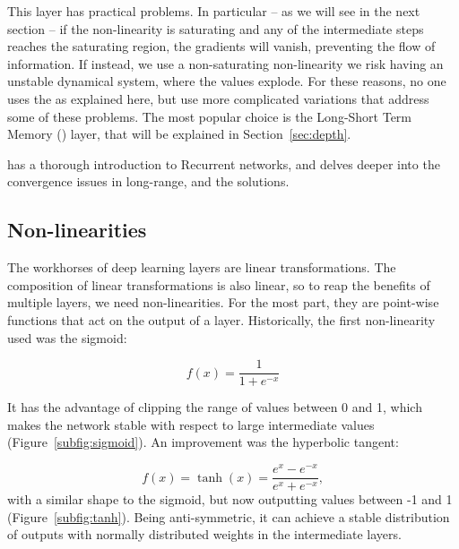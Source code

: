 This layer has practical problems.
In particular -- as we will see in the next section --  
if the non-linearity is saturating and any of the intermediate steps reaches the saturating region, the gradients will vanish, preventing the flow of information.
If instead, we use a non-saturating non-linearity we risk having an unstable dynamical system, where the values explode.
For these reasons, no one uses the \RNN{} as explained here, but use more complicated variations that address some of these problems.
The most popular choice \sidenote{\LSTM} is the Long-Short Term Memory (\LSTM) layer, that will be explained in Section~\ref{sec:depth}.


\citet{unreasonable_RNN} has a thorough introduction to Recurrent networks, and \citet{colah_rnn} delves deeper into the convergence issues in long-range, and the solutions.

\subsection{Non-linearities}
The workhorses of deep learning layers are linear transformations.
The composition of linear transformations is also linear, so to reap the benefits of multiple layers, we need non-linearities.
For the most part, they are point-wise functions that act on the output of a layer.
Historically, the first non-linearity used was the sigmoid:

\begin{equation*}
f(x) = \frac{1}{1 + e^{- x}}
\end{equation*}

It has the advantage of clipping the range of values between 0 and 1, which makes the network stable with respect to large intermediate values (Figure~\ref{subfig:sigmoid}).
An improvement was the hyperbolic tangent:

\begin{equation*}
f(x) = \tanh(x) = \frac{e^x - e^{-x}}{e^x + e^{-x}},
\end{equation*}
with a similar shape to the sigmoid, but now outputting values between -1 and 1 (Figure~\ref{subfig:tanh}).
Being anti-symmetric, it can achieve a stable distribution of outputs with normally distributed weights in the intermediate layers.

